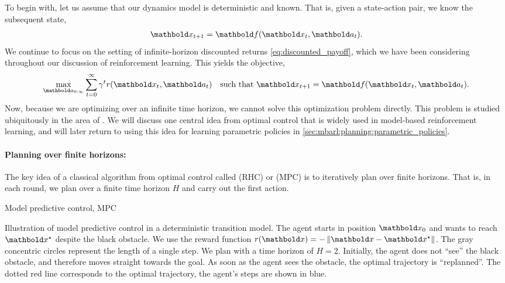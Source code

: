 To begin with, let us assume that our dynamics model is deterministic and known.
That is, given a state-action pair, we know the subsequent state, \begin{align}
  \vx_{t+1} = \vf(\vx_t, \va_t).
\end{align}
We continue to focus on the setting of infinite-horizon discounted returns \eqref{eq:discounted_payoff}, which we have been considering throughout our discussion of reinforcement learning.
This yields the objective, \begin{align}
  \max_{\va_{0:\infty}} \sum_{t=0}^\infty \gamma^t r(\vx_t, \va_t) \quad \text{such that}\ \vx_{t+1} = \vf(\vx_t, \va_t).
\end{align}
Now, because we are optimizing over an infinite time horizon, we cannot solve this optimization problem directly.
This problem is studied ubiquitously in the area of .
We will discuss one central idea from optimal control that is widely used in model-based reinforcement learning, and will later return to using this idea for learning parametric policies in \cref{sec:mbarl:planning:parametric_policies}.

\paragraph{Planning over finite horizons:}

The key idea of a classical algorithm from optimal control called  (RHC) or  (MPC) is to iteratively plan over finite horizons.
That is, in each round, we plan over a finite time horizon $H$ and carry out the first action.

\begin{algorithm}[H]
  \caption{Model predictive control, MPC}
\end{algorithm}

\begin{marginfigure}
  \caption{Illustration of model predictive control in a deterministic transition model.
  The agent starts in position $\vx_0$ and wants to reach $\vxs$ despite the black obstacle.
  We use the reward function $r(\vx) = -\norm{\vx-\vxs}$.
  The gray concentric circles represent the length of a single step.
  We plan with a time horizon of $H=2$. Initially, the agent does not ``see'' the black obstacle, and therefore moves straight towards the goal.
  As soon as the agent sees the obstacle, the optimal trajectory is ``replanned''.
  The dotted red line corresponds to the optimal trajectory, the agent's steps are shown in blue.}
\end{marginfigure}

